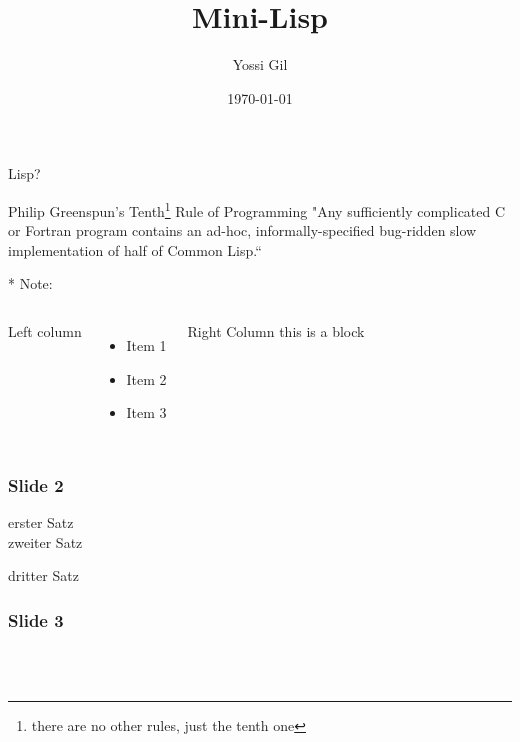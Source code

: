 \documentclass[fleqn]{beamer}
\title{Mini-Lisp}
\author{Yossi Gil}
\institute[Department of Computer Science, The Technion]{CS236703--Programming Languages}
\date{\today}
\begin{document}
\begin{frame}
  \titlepage
\end{frame}


\begin{frame}{Lisp?}
\begin{block}{
Philip Greenspun's Tenth\footnote{there are  no other rules, just the tenth one} Rule of Programming
}
"Any sufficiently complicated C or Fortran program contains an ad-hoc, informally-specified bug-ridden slow implementation of half of Common Lisp.“
\end{block}
* Note:  

  \begin{columns}[T]
    Left column
    \begin{itemize}
      \item Item 1
      \item Item 2
      \item Item 3
    \end{itemize}
    \begin{block}{Right Column}
      this is a block
    \end{block}
  \end{columns}
\end{frame}
\begin{frame}
  \frametitle{Slide 2}
  erster Satz\\
  zweiter Satz

  \pause

  dritter Satz
\end{frame}
\begin{frame}
  \frametitle{Slide 3}
  \\
  \\
\end{frame}
\end{document}
